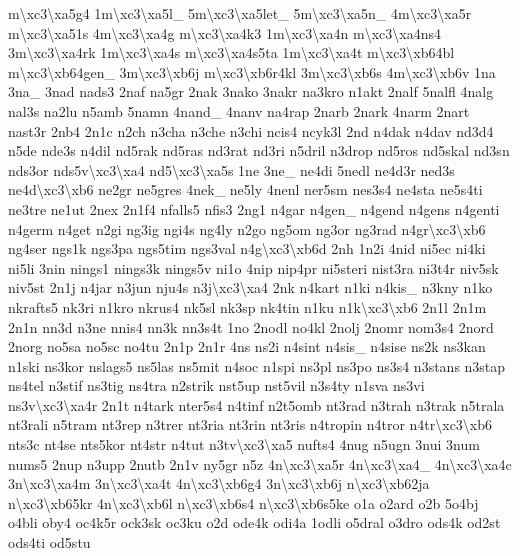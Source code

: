 {m\textbackslash{}xc3\textbackslash{}xa5g4 1m\textbackslash{}xc3\textbackslash{}xa5l\-\_\- 5m\textbackslash{}xc3\textbackslash{}xa5let\-\_\- 5m\textbackslash{}xc3\textbackslash{}xa5n\-\_\- 4m\textbackslash{}xc3\textbackslash{}xa5r m\textbackslash{}xc3\textbackslash{}xa51s 4m\textbackslash{}xc3\textbackslash{}xa4g m\textbackslash{}xc3\textbackslash{}xa4k3 1m\textbackslash{}xc3\textbackslash{}xa4n m\textbackslash{}xc3\textbackslash{}xa4ns4 3m\textbackslash{}xc3\textbackslash{}xa4rk 1m\textbackslash{}xc3\textbackslash{}xa4s m\textbackslash{}xc3\textbackslash{}xa4s5ta 1m\textbackslash{}xc3\textbackslash{}xa4t m\textbackslash{}xc3\textbackslash{}xb64bl m\textbackslash{}xc3\textbackslash{}xb64gen\-\_\- 3m\textbackslash{}xc3\textbackslash{}xb6j m\textbackslash{}xc3\textbackslash{}xb6r4kl 3m\textbackslash{}xc3\textbackslash{}xb6s 4m\textbackslash{}xc3\textbackslash{}xb6v 1na 3na\-\_\- 3nad nads3 2naf na5gr 2nak 3nako 3nakr na3kro n1akt 2nalf 5nalfl 4nalg nal3s na2lu n5amb 5namn 4nand\-\_\- 4nanv na4rap 2narb 2nark 4narm 2nart nast3r 2nb4 2n1c n2ch n3cha n3che n3chi ncis4 ncyk3l 2nd n4dak n4dav nd3d4 n5de nde3s n4dil nd5rak nd5ras nd3rat nd3ri n5dril n3drop nd5ros nd5skal nd3sn nds3or nds5v\textbackslash{}xc3\textbackslash{}xa4 nd5\textbackslash{}xc3\textbackslash{}xa5s 1ne 3ne\-\_\- ne4di 5nedl ne4d3r ned3s ne4d\textbackslash{}xc3\textbackslash{}xb6 ne2gr ne5gres 4nek\-\_\- ne5ly 4nenl ner5sm nes3s4 ne4sta ne5s4ti ne3tre ne1ut 2nex 2n1f4 nfalls5 nfis3 2ng1 n4gar n4gen\-\_\- n4gend n4gens n4genti n4germ n4get n2gi ng3ig ngi4s ng4ly n2go ng5om ng3or ng3rad n4gr\textbackslash{}xc3\textbackslash{}xb6 ng4ser ngs1k ngs3pa ngs5tim ngs3val n4g\textbackslash{}xc3\textbackslash{}xb6d 2nh 1n2i 4nid ni5ec ni4ki ni5li 3nin nings1 nings3k nings5v ni1o 4nip nip4pr ni5steri nist3ra ni3t4r niv5sk niv5st 2n1j n4jar n3jun nju4s n3j\textbackslash{}xc3\textbackslash{}xa4 2nk n4kart n1ki n4kis\-\_\- n3kny n1ko nkrafts5 nk3ri n1kro nkrus4 nk5sl nk3sp nk4tin n1ku n1k\textbackslash{}xc3\textbackslash{}xb6 2n1l 2n1m 2n1n nn3d n3ne nnis4 nn3k nn3s4t 1no 2nodl no4kl 2nolj 2nomr nom3s4 2nord 2norg no5sa no5sc no4tu 2n1p 2n1r 4ns ns2i n4sint n4sis\-\_\- n4sise ns2k ns3kan n1ski ns3kor nslags5 ns5las ns5mit n4soc n1spi ns3pl ns3po ns3s4 n3stans n3stap ns4tel n3stif ns3tig ns4tra n2strik nst5up nst5vil n3s4ty n1sva ns3vi ns3v\textbackslash{}xc3\textbackslash{}xa4r 2n1t n4tark nter5s4 n4tinf n2t5omb nt3rad n3trah n3trak n5trala nt3rali n5tram nt3rep n3trer nt3ria nt3rin nt3ris n4tropin n4tror n4tr\textbackslash{}xc3\textbackslash{}xb6 nts3c nt4se nts5kor nt4str n4tut n3tv\textbackslash{}xc3\textbackslash{}xa5 nufts4 4nug n5ugn 3nui 3num nums5 2nup n3upp 2nutb 2n1v ny5gr n5z 4n\textbackslash{}xc3\textbackslash{}xa5r 4n\textbackslash{}xc3\textbackslash{}xa4\-\_\- 4n\textbackslash{}xc3\textbackslash{}xa4c 3n\textbackslash{}xc3\textbackslash{}xa4m 3n\textbackslash{}xc3\textbackslash{}xa4t 4n\textbackslash{}xc3\textbackslash{}xb6g4 3n\textbackslash{}xc3\textbackslash{}xb6j n\textbackslash{}xc3\textbackslash{}xb62ja n\textbackslash{}xc3\textbackslash{}xb65kr 4n\textbackslash{}xc3\textbackslash{}xb6l n\textbackslash{}xc3\textbackslash{}xb6s4 n\textbackslash{}xc3\textbackslash{}xb6s5ke o1a o2ard o2b 5o4bj o4bli oby4 oc4k5r ock3sk oc3ku o2d ode4k odi4a 1odli o5dral o3dro ods4k od2st ods4ti od5stu }
